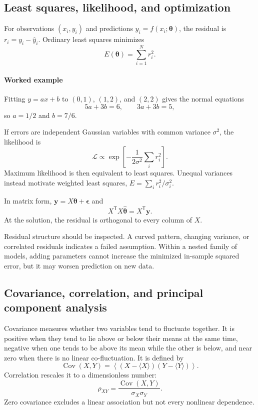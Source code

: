 \subsection{Least squares, likelihood, and optimization}
\label{math:least-squares}

For observations $(x_i,y_i)$ and predictions $\hat y_i=f(x_i;\boldsymbol{\theta})$, the residual is $r_i=y_i-\hat y_i$.
Ordinary least squares minimizes
\[
    E(\boldsymbol{\theta})=\sum_{i=1}^{N}r_i^2.
\]

\paragraph{Worked example}
Fitting $y=ax+b$ to $(0,1)$, $(1,2)$, and $(2,2)$ gives the normal equations
\[
    5a+3b=6, \qquad 3a+3b=5,
\]
so $a=1/2$ and $b=7/6$.

If errors are independent Gaussian variables with common variance $\sigma^2$, the likelihood is
\[
    \mathcal{L}\propto\exp\left[-\frac{1}{2\sigma^2}\sum_i r_i^2\right].
\]
Maximum likelihood is then equivalent to least squares.
Unequal variances instead motivate weighted least squares, $E=\sum_i r_i^2/\sigma_i^2$.

In matrix form, $\mathbf{y}=X\boldsymbol{\theta}+\boldsymbol{\epsilon}$ and
\[
    X^{\mathsf T}X\hat{\boldsymbol{\theta}}=X^{\mathsf T}\mathbf{y}.
\]
At the solution, the residual is orthogonal to every column of $X$.

Residual structure should be inspected.
A curved pattern, changing variance, or correlated residuals indicates a failed assumption.
Within a nested family of models, adding parameters cannot increase the minimized in-sample squared error, but it may worsen prediction on new data.


\subsection{Covariance, correlation, and principal component analysis}
\label{math:pca}

Covariance measures whether two variables tend to fluctuate together.
It is positive when they tend to lie above or below their means at the same time, negative when one tends to be above its mean while the other is below, and near zero when there is no linear co-fluctuation.
It is defined by
\[
    \operatorname{Cov}(X,Y)=\left\langle(X-\langle X\rangle)(Y-\langle Y\rangle)\right\rangle.
\]
Correlation rescales it to a dimensionless number:
\[
    \rho_{XY}=\frac{\operatorname{Cov}(X,Y)}{\sigma_X\sigma_Y}.
\]
Zero covariance excludes a linear association but not every nonlinear dependence.

